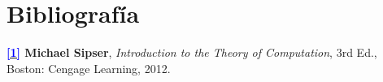 \documentclass[../main]{subfiles}
\begin{document}
\chapter{Bibliografía}

{
\hypersetup{linkcolor=black}
\minitoc
}

\hypertarget{target:zona}{}



{\bfseries \hyperlink{target:zona}{\textcolor{blue}{[1]}} Michael Sipser}, \emph{Introduction to the Theory of Computation}, 3rd Ed., Boston: Cengage Learning, 2012.
\end{document}
